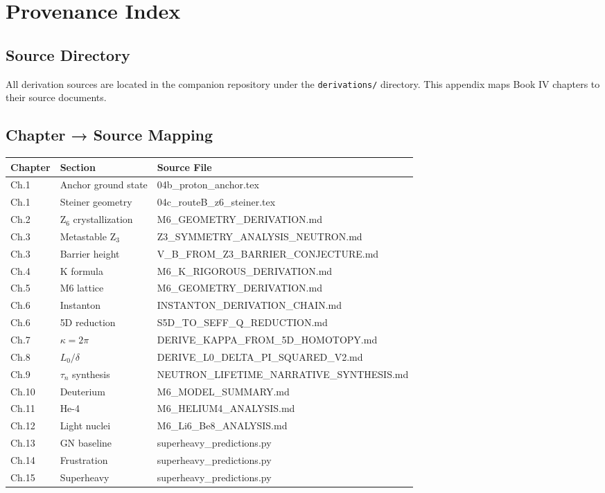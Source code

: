 
\chapter{Provenance Index}
\label{app:provenance}

\section{Source Directory}

All derivation sources are located in the companion repository under the
\texttt{derivations/} directory. This appendix maps Book IV chapters to
their source documents.

\section{Chapter → Source Mapping}

\begin{longtable}{lll}
\toprule
Chapter & Section & Source File \\
\midrule
\endhead
Ch.1 & Anchor ground state & 04b\_proton\_anchor.tex \\
Ch.1 & Steiner geometry & 04c\_routeB\_z6\_steiner.tex \\
Ch.2 & Z$_6$ crystallization & M6\_GEOMETRY\_DERIVATION.md \\
Ch.3 & Metastable Z$_3$ & Z3\_SYMMETRY\_ANALYSIS\_NEUTRON.md \\
Ch.3 & Barrier height & V\_B\_FROM\_Z3\_BARRIER\_CONJECTURE.md \\
Ch.4 & K formula & M6\_K\_RIGOROUS\_DERIVATION.md \\
Ch.5 & M6 lattice & M6\_GEOMETRY\_DERIVATION.md \\
Ch.6 & Instanton & INSTANTON\_DERIVATION\_CHAIN.md \\
Ch.6 & 5D reduction & S5D\_TO\_SEFF\_Q\_REDUCTION.md \\
Ch.7 & $\kappa = 2\pi$ & DERIVE\_KAPPA\_FROM\_5D\_HOMOTOPY.md \\
Ch.8 & $L_0/\delta$ & DERIVE\_L0\_DELTA\_PI\_SQUARED\_V2.md \\
Ch.9 & $\tau_n$ synthesis & NEUTRON\_LIFETIME\_NARRATIVE\_SYNTHESIS.md \\
Ch.10 & Deuterium & M6\_MODEL\_SUMMARY.md \\
Ch.11 & He-4 & M6\_HELIUM4\_ANALYSIS.md \\
Ch.12 & Light nuclei & M6\_Li6\_Be8\_ANALYSIS.md \\
Ch.13 & GN baseline & superheavy\_predictions.py \\
Ch.14 & Frustration & superheavy\_predictions.py \\
Ch.15 & Superheavy & superheavy\_predictions.py \\
\bottomrule
\end{longtable}

